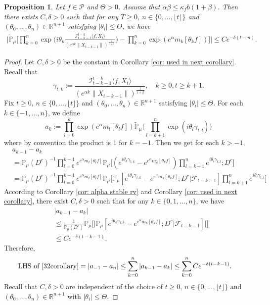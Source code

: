 \documentclass[12pt]{amsart}
\theoremstyle{plain}
\newtheorem{prop}[thm]{Proposition}
\theoremstyle{definition}
\numberwithin{equation}{section}
\begin{document}
\begin{prop}\label{corollary31}
Let $f\in \mathcal{P}$ and $\Theta>0$. Assume that $\alpha\beta\leq\kappa_fb(1+\beta)$. Then there exists $C,\delta>0$ such that for any $T\geq 0$, $n \in \{0,...,\lfloor t \rfloor\}$ and $(\theta_0,...,\theta_n)\in \mathbb{R}^{n+1}$ satisfying $|\theta_i|\leq \Theta$, we have
\begin{align}
\label{32corollary}
    \Big|\mathbb{\tilde{P}}_{\mu}\Big[\prod_{k=0}^n\exp\Big(i\theta_k \frac {\mathcal I_{t-k-1}^{t-k}\langle f ,X_t\rangle}{(e^{\alpha k}\|X_{t-k-1}\|)^\frac{1}{1+\beta}}\Big)-\prod_{k=0}^n\exp(e^{\alpha}m_k[\theta_k f])\Big]\Big|\leq C e^{-\delta(t-n)}.
\end{align}
\end{prop}
\begin{proof}
	Let $C,\delta > 0$ be the constant in Corollary \ref{cor: used in next corollary}.
    Recall that \[\gamma_{t,k}:=\frac {\mathcal I_{t-k-1}^{t-k}\langle f ,X_t\rangle}{(e^{\alpha k}\|X_{t-k-1}\|)^\frac{1}{1+\beta}},\quad k \geq 0, t\geq k+1. \]
    Fix $t\geq 0$, $n \in \{0,...,\lfloor t \rfloor\}$ and $(\theta_0,...,\theta_n)\in \mathbb{R}^{n+1}$ satisfying $|\theta_i|\leq \Theta$.
    For each $k\in\{-1,...,n\}$, we define
    \[a_k:=\prod_{l=0}^{k}\exp(e^{\alpha}m_l[\theta_lf])\mathbb{\tilde{P}}_{\mu}\Big(\prod_{l=k+1}^{n}\exp\left(i\theta_l\gamma_{t,l}\right)\Big)\]
     where by convention the product is $1$ for $k=-1$. Then we get for each $k > -1$,
    \begin{align*}
        &a_{k-1} - a_k
        \\&=\mathbb{P}_{\mu}(D^c)^{-1}\prod_{l=0}^{k-1}e^{e^{\alpha}m_l[\theta_l f]}\mathbb{P}_{\mu}\Big[(e^{i\theta_{k}\gamma_{t,k}}-e^{e^{\alpha}m_k[\theta_k f]})\prod_{l=k+1}^ne^{i\theta_{l}\gamma_{t,l}};D^c\Big]
        \\&=\mathbb{P}_{\mu}(D^c)^{-1}\prod_{l=0}^{k-1}e^{e^{\alpha}m_l[\theta_l f]}\mathbb{P}_{\mu}\Big[\mathbb P_\mu[e^{i\theta_{k}\gamma_{t,k}}-e^{e^{\alpha}m_k[\theta_k f]}; D^c|\mathscr F_{t-k-1}]\prod_{l=k+1}^ne^{i\theta_{l}\gamma_{t,l}}\Big]
    \end{align*}
    According to Corollary \ref{cor: alpha stable rv} and Corollary \ref{cor: used in next corollary}, there exist $C,\delta>0$ such that for any $k\in\{0,1,...,n\}$, we have
    \begin{align*}
        &|a_{k-1}- a_k|
        \\&\leq \frac{1}{\mathbb{P}_{\mu}(D^c)}\mathbb{P}_{\mu}\Big[\big|\mathbb P_\mu[e^{i\theta_{k}\gamma_{t,k}}-e^{e^{\alpha}m_k[\theta_k f]}; D^c\big|\mathscr{F}_{t-k-1}]\big|\Big]
        \\& \leq C e^{-\delta(t-k-1)}.
    \end{align*}
Therefore,
\begin{align}
    \text{LHS of \eqref{32corollary}}&= \left|a_{-1}-a_n\right|
    \leq\sum_{k=0}^n\left|a_{k-1}-a_k\right|
    \leq \sum_{k=0}^n C e^{-\delta(t-k-1)}.
\end{align}
	Recall that $C, \delta>0$ are independent of the choice of $t\geq 0$, $n \in \{0,...,\lfloor t \rfloor\}$ and $(\theta_0,...,\theta_n)\in \mathbb{R}^{n+1}$ with $|\theta_i|\leq \Theta$.
\end{proof}
\end{document}
